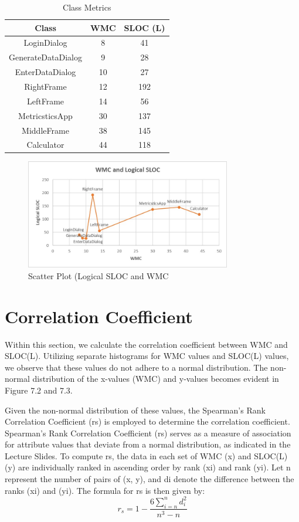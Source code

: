 \documentclass[english,12pt,a4paper]{report}
\begin{document}
	\begin{table}[htbp]
		\centering
		
		\begin{tabular}{|c|c|c|}
			\hline
			\textbf{Class} & \textbf{WMC} & \textbf{SLOC (L)} \\
			\hline
			LoginDialog & 8 & 41 \\
			\hline
			GenerateDataDialog & 9 & 28 \\
			\hline
			EnterDataDialog & 10 & 27 \\
			\hline
			RightFrame	& 12 & 192 \\
			\hline
			LeftFrame & 14 & 56 \\
			\hline
			MetricsticsApp & 30 & 137 \\
			\hline
			MiddleFrame	 & 38 & 145 \\
			\hline
			Calculator	& 44 & 118 \\
			\hline
		\end{tabular}
		\caption{Class Metrics}
	\end{table}
	\begin{figure}[H]
		\centering
		\includegraphics[width=0.8\textwidth]{images/ScatterPlot.png}
		\caption{Scatter Plot (Logical SLOC and WMC}
		\label{fig:Scatter Plot (Logical SLOC and WMC}
	\end{figure}
	
	\section{Correlation Coefficient}
	Within this section, we calculate the correlation coefficient between WMC and SLOC(L). Utilizing separate histograms for WMC values and SLOC(L) values, we observe that these values do not adhere to a normal distribution. The non-normal distribution of the x-values (WMC) and y-values becomes evident in Figure 7.2 and 7.3.
	
	Given the non-normal distribution of these values, the Spearman’s Rank Correlation Coefficient (rs) is employed to determine the correlation coefficient. Spearman’s Rank Correlation Coefficient (rs) serves as a measure of association for attribute values that deviate from a normal distribution, as indicated in the Lecture Slides. To compute rs, the data in each set of WMC (x) and SLOC(L) (y) are individually ranked in ascending order by rank (xi) and rank (yi). Let n represent the number of pairs of (x, y), and di denote the difference between the ranks (xi) and (yi). The formula for rs is then given by:
	\[ r_{s} = 1 - \frac{6\sum_{i=n}^{n}{d^{2}_i}}{n^{3}-n} \]\\
	
\end{document}

